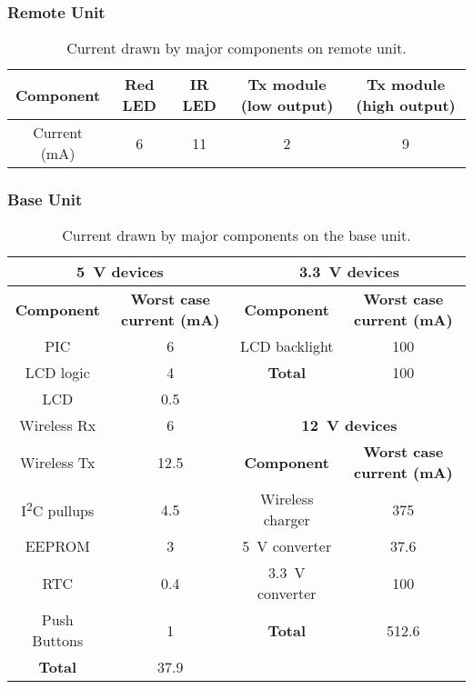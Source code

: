 \subsubsection{Remote Unit}

\begin{table}[htbp]
	\begin{center}
	\begin{tabular}{|c|c|c|c|c|}
	\hline
	Component & Red LED & IR LED & Tx module (low output) & Tx module (high output)\\
	\hline
	Current (mA) & 6 & 11 & 2 & 9 \\
	\hline
	\end{tabular}
	\caption{Current drawn by major components on remote unit.}
	\label{fig: remote current}
	\end{center}
\end{table}


\subsubsection{Base Unit}

\begin{table}[htbp]
	\begin{center}
	\begin{tabular}{|c|c|c|c|}
	\hline
	\multicolumn{2}{|c}{\textbf{\SI{5}{\volt} devices}} & \multicolumn{2}{|c|}{\textbf{\SI{3.3}{\volt} devices}}\\
	\hline
	\textbf{Component} & \textbf{Worst case current (\si{\milli\ampere})} & \textbf{Component} & \textbf{Worst case current (\si{\milli\ampere})} \\
	\hline
	PIC & 6 & LCD backlight & 100 \\
	\cline{3-4}
	LCD logic & 4 & \textbf{Total} & 100\\
	\cline{3-4}
	LCD & 0.5 & \multicolumn{2}{c}{} \\
	\cline{3-4}
	Wireless Rx & 6 &  \multicolumn{2}{c|}{\textbf{\SI{12}{\volt} devices}} \\
	\cline{3-4}
	Wireless Tx & 12.5 & \textbf{Component} & \textbf{Worst case current (\si{\milli\ampere})}  \\
	\cline{3-4}
	I\textsuperscript{2}C pullups & 4.5 & Wireless charger & 375 \\
	EEPROM & 3 & \SI{5}{\volt} converter & 37.6 \\
	RTC & 0.4 & \SI{3.3}{\volt} converter & 100 \\
	\cline{3-4}
	Push Buttons & 1 & \textbf{Total} & 512.6  \\
	\hline
	\textbf{Total} & 37.9  \\
	\cline{1-2}
	\end{tabular}
	\caption{Current drawn by major components on the base unit.}
	\label{fig: base current}
	\end{center}
\end{table}

